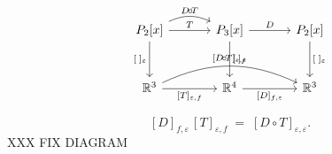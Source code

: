 \documentclass{report}
\begin{document}
     
\[
\begin{tikzcd}[row sep=2.7em,column sep=3.4em]
P_{2}[x]
  \arrow[r,"T"]
  \arrow[d,"{[\;]_{\varepsilon}}"']
  \arrow[bend left=25,r,"{D\!\circ\! T}"]
& P_{3}[x]
  \arrow[r,"D"]
  \arrow[d,"{[\;]_{f}}"]
& P_{2}[x]
  \arrow[d,"{[\;]_{\varepsilon}}"] \\[0.2em]
\mathbb{R}^{3}
  \arrow[r,"{[T]_{\varepsilon,f}}"']
  \arrow[bend left=25,rr,"{[D\!\circ\! T]_{\varepsilon,\varepsilon}}"]
& \mathbb{R}^{4}
  \arrow[r,"{[D]_{f,\varepsilon}}"']
& \mathbb{R}^{3}
\end{tikzcd}
\]

\[
[D]_{f,\varepsilon}\,[T]_{\varepsilon,f}
  \;=\;
[D\!\circ\! T]_{\varepsilon,\varepsilon}.
\]
 XXX FIX DIAGRAM
  
\end{document}
